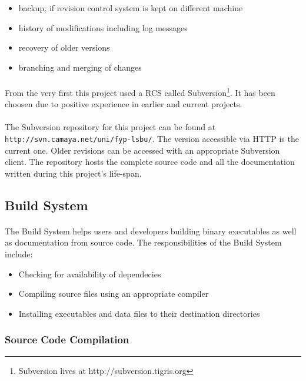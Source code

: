 \begin{itemize}
\item backup, if revision control system is kept on different machine
\item history of modifications including log messages
\item recovery of older versions
\item branching and merging of changes
\end{itemize}

\paragraph{}
From the very first this project used a RCS called Subversion\footnote{Subversion lives at http://subversion.tigris.org}. It has been choosen due to positive experience in earlier and current projects.

\paragraph{}
The Subversion repository for this project can be found at \\ \texttt{http://svn.camaya.net/uni/fyp-lsbu/}. The version accessible via HTTP is the current one. Older revisions can be accessed with an appropriate Subversion client. The repository hosts the complete source code and all the documentation written during this project's life-span.


\subsection{Build System}
\paragraph{}
The Build System helps users and developers building binary executables as well as documentation from source code. The responsibilities of the Build System include:

\begin{itemize}
\item Checking for availability of dependecies
\item Compiling source files using an appropriate compiler
\item Installing executables and data files to their destination directories
\end{itemize}

\subsubsection{Source Code Compilation}
